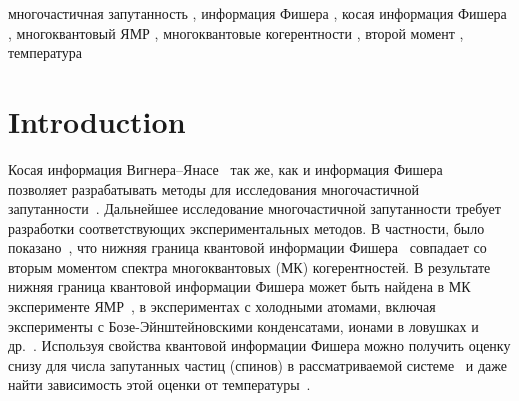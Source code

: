 \documentclass[preprint,12pt]{elsarticle}
\begin{document}
\begin{frontmatter}


\begin{keyword}
    многочастичная запутанность \sep
    информация Фишера \sep
    косая информация Фишера \sep
    многоквантовый ЯМР \sep
    многоквантовые когерентности \sep
    второй момент \sep
    температура
    
\end{keyword}

\end{frontmatter}



\section{Introduction}
\label{sec:1}
Косая информация Вигнера--Янасе~\cite{1,2,3,4} так же, как и информация Фишера~\cite{5,6} позволяет разрабатывать методы для исследования многочастичной запутанности~\cite{7,8}. 
Дальнейшее исследование многочастичной запутанности требует разработки соответствующих экспериментальных методов.
В частности, было показано~\cite{7,9}, что нижняя граница квантовой информации Фишера~\cite{5,6} совпадает со вторым моментом спектра многоквантовых (МК) когерентностей. 
В результате нижняя граница квантовой информации Фишера может быть найдена в МК эксперименте ЯМР~\cite{10},
в экспериментах с холодными атомами, включая эксперименты с Бозе-Эйнштейновскими конденсатами, ионами в ловушках и др.~\cite{11,12,13,14,15}. 
Используя свойства квантовой информации Фишера можно получить оценку снизу для числа запутанных частиц (спинов) в рассматриваемой системе~\cite{7} и даже найти зависимость этой оценки от температуры~\cite{9}. 
\end{document}
